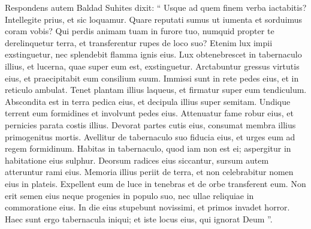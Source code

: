 \begin{biblechapter}
\begin{biblechapter}
\begin{biblechapter}
\begin{biblechapter}
\begin{biblechapter}
\begin{biblechapter}
\begin{biblechapter}
\begin{biblechapter}
\begin{biblechapter}
\begin{biblechapter}
\begin{biblechapter}
\begin{biblechapter}
\begin{biblechapter}
\begin{biblechapter}
\begin{biblechapter}
\begin{biblechapter}
\begin{biblechapter}
\begin{biblechapter}
\verse Respondens autem Baldad Suhites dixit:
 \verse “ Usque ad quem finem verba iactabitis?
 Intellegite prius, et sic loquamur.
 \verse Quare reputati sumus ut iumenta
 et sorduimus coram vobis?
 \verse Qui perdis animam tuam in furore tuo,
 numquid propter te derelinquetur terra,
 et transferentur rupes de loco suo?
 \verse Etenim lux impii exstinguetur,
 nec splendebit flamma ignis eius.
 \verse Lux obtenebrescet in tabernaculo illius,
 et lucerna, quae super eum est, exstinguetur.
 \verse Arctabuntur gressus virtutis eius,
 et praecipitabit eum consilium suum.
 \verse Immissi sunt in rete pedes eius,
 et in reticulo ambulat.
 \verse Tenet plantam illius laqueus,
 et firmatur super eum tendiculum.
 \verse Abscondita est in terra pedica eius,
 et decipula illius super semitam.
 \verse Undique terrent eum formidines
 et involvunt pedes eius.
 \verse Attenuatur fame robur eius,
 et pernicies parata costis illius.
 \verse Devorat partes cutis eius,
 consumat membra illius primogenitus mortis.
 \verse Avellitur de tabernaculo suo fiducia eius,
 et urges eum ad regem formidinum.
 \verse Habitas in tabernaculo, quod iam non est ei;
 aspergitur in habitatione eius sulphur.
 \verse Deorsum radices eius siccantur,
 sursum autem atteruntur rami eius.
 \verse Memoria illius periit de terra,
 et non celebrabitur nomen eius in plateis.
 \verse Expellent eum de luce in tenebras
 et de orbe transferent eum.
 \verse Non erit semen eius neque progenies in populo suo,
 nec ullae reliquiae in commoratione eius.
 \verse In die eius stupebunt novissimi,
 et primos invadet horror.
 \verse Haec sunt ergo tabernacula iniqui;
 et iste locus eius, qui ignorat Deum ”.
 

\end{biblechapter}
\end{biblechapter}
\end{biblechapter}
\end{biblechapter}
\end{biblechapter}
\end{biblechapter}
\end{biblechapter}
\end{biblechapter}
\end{biblechapter}
\end{biblechapter}
\end{biblechapter}
\end{biblechapter}
\end{biblechapter}
\end{biblechapter}
\end{biblechapter}
\end{biblechapter}
\end{biblechapter}
\end{biblechapter}
